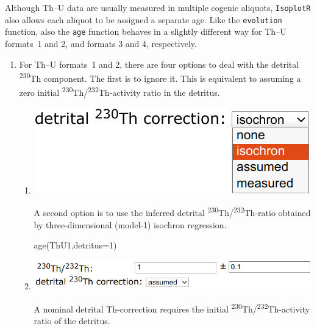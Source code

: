 \begin{refsection}
Although Th--U data are usually measured in multiple cogenic aliquots,
\texttt{IsoplotR} also allows each aliquot to be assigned a separate
age. Like the \texttt{evolution} function, also the \texttt{age}
function behaves in a slightly different way for Th--U formats~1 and
2, and formats 3 and 4, respectively.

\begin{enumerate}

\item For Th--U formats~1 and 2, there are four options to deal with
  the detrital \textsuperscript{230}Th component. The first is to
  ignore it. This is equivalent to assuming a zero initial
  \textsuperscript{230}Th/\textsuperscript{232}Th-activity ratio in
  the detritus.

  \begin{enumerate}
  
  \item \begin{minipage}[t]{.4\linewidth}
    \strut\vspace*{-\baselineskip}\newline
    \includegraphics[width=\linewidth]{../figures/ThUdetritalisochroncorr.png}
  \end{minipage}
    \begin{minipage}[t]{.6\linewidth}
      A second option is to use the inferred detrital
      \textsuperscript{230}Th/\textsuperscript{232}Th-ratio obtained
      by three-dimensional (model-1) isochron regression.
    \end{minipage}

\begin{console}
age(ThU1,detritus=1)
\end{console}

\item \begin{minipage}[t]{.7\linewidth}
    \strut\vspace*{-\baselineskip}\newline
    \includegraphics[width=\linewidth]{../figures/ThUinitialThassumed.png}
  \end{minipage}
    \begin{minipage}[t]{.3\linewidth}
      A nominal detrital Th-correction requires the initial
      \textsuperscript{230}Th/\textsuperscript{232}Th-activity ratio
      of the detritus.\\
    \end{minipage}


\end{enumerate}
\end{enumerate}
\end{refsection}
